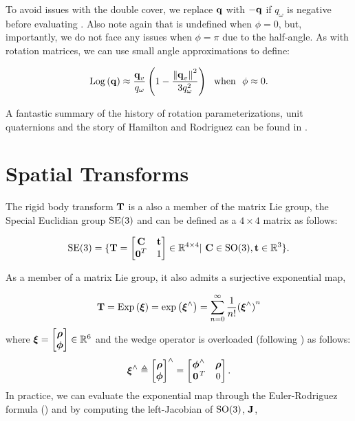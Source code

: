 \noindent To avoid issues with the double cover, we replace $\boldsymbol{\mathbf{q}}$ with $-\boldsymbol{\mathbf{q}}$ if $q_\omega$ is negative before evaluating . Also note again that  is undefined when $\phi = 0$, but, importantly, we do not face any issues when $\phi = \pi$ due to the half-angle. As with rotation matrices, we can use small angle approximations to define:

\begin{equation}
	\mathrm{Log}\left({\boldsymbol{\mathbf{q}}}\right) \approx \frac{\boldsymbol{\mathbf{q}}_v}{q_\omega} \left( 1 - \frac{\left\Vert\boldsymbol{\mathbf{q}}_v\right\Vert^2}{3 q_\omega^2}\right) ~~ \textrm{when} ~~ \phi \approx 0. 
\end{equation}

A fantastic summary of the history of rotation parameterizations, unit quaternions and the story of Hamilton and Rodriguez can be found in \cite{Altmann1989-ru}.



\section{Spatial Transforms}
The rigid body transform $\boldsymbol{\mathbf{T}}$ is a also a member of the matrix Lie group, the Special Euclidian group $\mathrm{SE}(3)$ and can be defined as a $4 \times 4$ matrix as follows:

\begin{equation}
\mathrm{SE}(3) = \{ \boldsymbol{\mathbf{T}} = \begin{bmatrix} \boldsymbol{\mathbf{C}} & \boldsymbol{\mathbf{t}} \\ \boldsymbol{\mathbf{0}}^T & 1 \end{bmatrix} \in \mathbb{R}{}^{4 \times 4} | ~  \boldsymbol{\mathbf{C}} \in \mathrm{SO}(3),  \boldsymbol{\mathbf{t}} \in \mathbb{R}{}^3  \}.
\end{equation}

As a member of a matrix Lie group, it also admits a surjective exponential map,

\begin{equation}
\boldsymbol{\mathbf{T}} = \mathrm{Exp}\left({\boldsymbol{\mathbf{\xi}}}\right) = \mathrm{exp}\left({\boldsymbol{\mathbf{\xi}}}^{\wedge}\right) = \sum_{n=0}^{\infty}  \frac{1}{n!} {(\boldsymbol{\mathbf{\xi}}^\wedge)}^n	
\end{equation}
where $\boldsymbol{\mathbf{\xi}} = \begin{bmatrix} \boldsymbol{\mathbf{\rho}} \\ \boldsymbol{\mathbf{\phi}} \end{bmatrix} \in \mathbb{R}{}^6$ and the wedge operator is overloaded (following \cite{Barfoot2017-ri}) as follows:
\begin{equation}
  \boldsymbol{\mathbf{\xi}}^\wedge \triangleq \begin{bmatrix} \boldsymbol{\mathbf{\rho}} \\ \boldsymbol{\mathbf{\phi}} \end{bmatrix} ^\wedge = \begin{bmatrix}
  \boldsymbol{\mathbf{\phi}}^\wedge & \boldsymbol{\mathbf{\rho}} \\ \left.{\boldsymbol{\mathbf{0}}}\right.^T &  0 \end{bmatrix}.	
\end{equation}
In practice, we can evaluate the exponential map through the Euler-Rodriguez formula () and by computing the left-Jacobian of $\mathrm{SO}(3)$,  $\boldsymbol{\mathbf{J}}$, 

